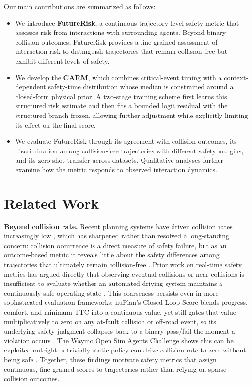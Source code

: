 \documentclass[letterpaper, 10 pt, conference]{ieeeconf}  %
\begin{document}
Our main contributions are summarized as follows:

\begin{itemize}

\item We introduce \textbf{FutureRisk}, a continuous trajectory-level safety metric that assesses risk from interactions with surrounding agents. Beyond binary collision outcomes, FutureRisk provides a fine-grained assessment of interaction risk to distinguish trajectories that remain collision-free but exhibit different levels of safety.

\item We develop the \textbf{CARM}, which combines critical-event timing with a context-dependent safety-time distribution whose median is constrained around a closed-form physical prior. A two-stage training scheme first learns this structured risk estimate and then fits a bounded logit residual with the structured branch frozen, allowing further adjustment while explicitly limiting its effect on the final score.

\item We evaluate FutureRisk through its agreement with collision outcomes, its discrimination among collision-free trajectories with different safety margins, and its zero-shot transfer across datasets. Qualitative analyses further examine how the metric responds to observed interaction dynamics.

\end{itemize}

\section{Related Work}
\label{sec:related}

\textbf{Beyond collision rate.} Recent planning systems have driven collision rates increasingly low \cite{hamidaoui2025survey}, which has sharpened rather than resolved a long-standing concern: collision occurrence is a direct measure of safety failure, but as an outcome-based metric it reveals little about the safety differences among trajectories that ultimately remain collision-free \cite{jiang2025interactive, cui2025unified}. Prior work on real-time safety metrics has argued directly that observing eventual collisions or near-collisions is insufficient to evaluate whether an automated driving system maintains a continuously safe operating state \cite{weng2020mprism}. This coarseness persists even in more sophisticated evaluation frameworks: nuPlan's Closed-Loop Score blends progress, comfort, and minimum TTC into a continuous value, yet still gates that value multiplicatively to zero on any at-fault collision or off-road event, so its underlying safety judgment collapses back to a binary pass/fail the moment a violation occurs \cite{caesar2021nuplan}. The Waymo Open Sim Agents Challenge shows this can be exploited outright: a trivially static policy can drive collision rate to zero without being safe \cite{montali2023wosac}. Together, these findings motivate safety metrics that assign continuous, fine-grained scores to trajectories rather than relying on sparse collision outcomes.
\end{document}
